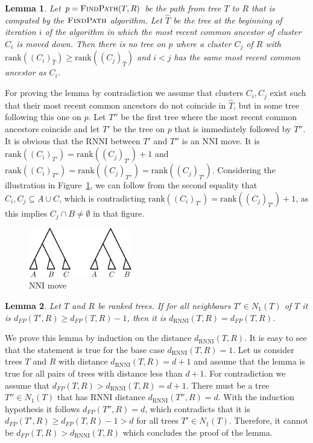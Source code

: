 \documentclass{amsart}
\newtheorem{lemma}{Lemma}
\newcommand{\rnni}{\mathrm{RNNI}}
\newcommand{\findpath}{\textsc{FindPath}}
\newcommand{\rank}{\mathrm{rank}}
\newcommand{\nni}{\mathrm{NNI}}
\begin{document}
\begin{lemma}
    Let $p = \findpath(T,R)$ be the path from tree $T$ to $R$ that is computed by the $\findpath$ algorithm.
    Let $\hat{T}$ be the tree at the beginning of iteration $i$ of the algorithm in which the most recent common ancestor of cluster $C_i$ is moved down.
    Then there is no tree on $p$ where a cluster $C_j$ of $R$ with $\rank((C_i)_{\hat{T}}) \geq \rank((C_j)_{\hat{T}})$ and $i < j$ has the same most recent common ancestor as $C_i$.
\end{lemma}

\proof

For proving the lemma by contradiction we assume that clusters $C_i, C_j$ exist such that their most recent common ancestors do not coincide in $\hat{T}$, but in some tree following this one on $p$.
Let $T''$ be the first tree where the most recent common ancestors coincide and let $T'$ be the tree on $p$ that is immediately followed by $T''$.
It is obvious that the $\rnni$ between $T'$ and $T''$ is an $\nni$ move.
It is $\rank((C_i)_{T'}) = \rank((C_j)_{T'}) + 1$ and $\rank((C_i)_{T''}) = \rank((C_j)_{T''}) = \rank((C_j)_{T'})$.
Considering the illustration in Figure~\ref{fig:nni_move}, we can follow from the second equality that $C_i, C_j \subseteq A \cup C$, which is contradicting $\rank((C_i)_{T'}) = \rank((C_j)_{T'}) + 1$, as this implies $C_j \cap B \neq \emptyset$ in that figure.


\begin{figure}[H]
\centering
\includegraphics[width=0.4\textwidth]{NNI_move}
\vspace{12pt}
\caption{$\nni$ move}
\label{fig:nni_move}
\end{figure}

\endproof

\begin{lemma}
    Let $T$ and $R$ be ranked trees.
    If for all neighbours $T' \in N_1(T)$ of $T$ it is $d_{FP}(T',R) \geq d_{FP}(T,R) - 1$, then it is $d_{\rnni}(T,R) = d_{FP}(T,R)$.
\end{lemma}

\proof
    We prove this lemma by induction on the distance $d_{\rnni}(T,R)$.
    It is easy to see that the statement is true for the base case $d_{\rnni}(T,R) = 1$.
    Let us consider trees $T$ and $R$ with distance $d_{\rnni}(T,R) = d+1$ and assume that the lemma is true for all pairs of trees with distance less than $d+1$.
    For contradiction we assume that $d_{FP}(T,R) > d_{\rnni}(T,R) = d+1$.
    There must be a tree $T'' \in N_1(T)$ that has $\rnni$ distance $d_{\rnni}(T'',R) = d$.
    With the induction hypothesis it follows $d_{FP}(T'',R) = d$, which contradicts that it is $d_{FP}(T',R) \geq d_{FP}(T,R) - 1 > d$ for all trees $T' \in N_1(T)$.
    Therefore, it cannot be $d_{FP}(T,R) > d_{\rnni}(T,R)$ which concludes the proof of the lemma.
\endproof
\end{document}
